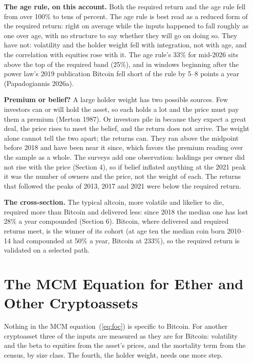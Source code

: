 \documentclass[11pt]{article}
\begin{document}
\textbf{The age rule, on this account.} Both the required return and the age rule fell from over 100\% to tens of percent. The age rule is best read as a reduced form of the required return: right on average while the inputs happened to fall roughly as one over age, with no structure to say whether they will go on doing so. They have not: volatility and the holder weight fell with integration, not with age, and the correlation with equities rose with it. The age rule's 33\% for mid-2026 sits above the top of the required band (25\%), and in windows beginning after the power law's 2019 publication Bitcoin fell short of the rule by 5--8 points a year (Papadogiannis 2026a).

\textbf{Premium or belief?} A large holder weight has two possible sources. Few investors can or will hold the asset, so each holds a lot and the price must pay them a premium (Merton 1987). Or investors pile in because they expect a great deal, the price rises to meet the belief, and the return does not arrive. The weight alone cannot tell the two apart; the returns can. They ran above the midpoint before 2018 and have been near it since, which favors the premium reading over the sample as a whole. The surveys add one observation: holdings per owner did not rise with the price (Section 4), so if belief inflated anything at the 2021 peak it was the number of owners and the price, not the weight of each. The returns that followed the peaks of 2013, 2017 and 2021 were below the required return.

\textbf{The cross-section.} The typical altcoin, more volatile and likelier to die, required more than Bitcoin and delivered less: since 2018 the median one has lost 28\% a year compounded (Section 6). Bitcoin, where delivered and required returns meet, is the winner of its cohort (at age ten the median coin born 2010--14 had compounded at 50\% a year, Bitcoin at 233\%), so the required return is validated on a selected path.

\section{The MCM Equation for Ether and Other Cryptoassets}

Nothing in the MCM equation~(\ref{eq:foc}) is specific to Bitcoin. For another cryptoasset three of the inputs are measured as they are for Bitcoin: volatility and the beta to equities from the asset's prices, and the mortality term from the census, by size class. The fourth, the holder weight, needs one more step.
\end{document}
